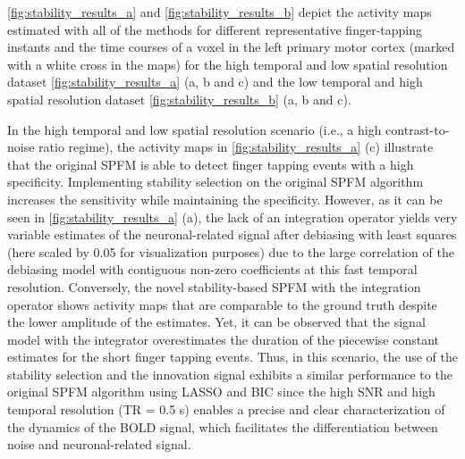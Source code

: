 \cref{fig:stability_results_a} and \cref{fig:stability_results_b} depict the
activity maps estimated with all of the methods for different representative
finger-tapping instants and the time courses of a voxel in the left primary
motor cortex (marked with a white cross in the maps) for the high temporal and
low spatial resolution dataset \cref{fig:stability_results_a} (a, b and c) and
the low temporal and high spatial resolution dataset
\cref{fig:stability_results_b} (a, b and c).

In the high temporal and low spatial resolution scenario (i.e., a high
contrast-to-noise ratio regime), the activity maps in
\cref{fig:stability_results_a} (c) illustrate that the original SPFM is able to
detect finger tapping events with a high specificity. Implementing stability
selection on the original SPFM algorithm increases the sensitivity while
maintaining the specificity. However, as it can be seen in
\cref{fig:stability_results_a} (a), the lack of an integration operator yields
very variable estimates of the neuronal-related signal after debiasing with
least squares (here scaled by 0.05 for visualization purposes) due to the large
correlation of the debiasing model with contiguous non-zero coefficients at this
fast temporal resolution. Conversely, the novel stability-based SPFM with the
integration operator shows activity maps that are comparable to the ground truth
despite the lower amplitude of the estimates. Yet, it can be observed that the
signal model with the integrator overestimates the duration of the piecewise
constant estimates for the short finger tapping events. Thus, in this scenario,
the use of the stability selection and the innovation signal exhibits a similar
performance to the original SPFM algorithm using LASSO and BIC since the high
SNR and high temporal resolution (TR = 0.5 s) enables a precise and clear
characterization of the dynamics of the BOLD signal, which facilitates the
differentiation between noise and neuronal-related signal.

